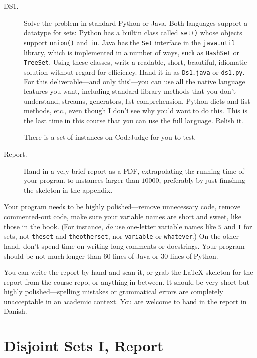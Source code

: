 \documentclass{tufte-handout}
\begin{document}
\begin{description}
  \item[DS1.]
    Solve the problem in standard Python or Java.
    Both languages support a datatype for sets:
    Python has a builtin class called \texttt{set()} whose objects support \texttt{union()} and \texttt{in}.
    Java has the \texttt{Set} interface in the \texttt{java.util} library, which is implemented in a number of ways, such as \texttt{HashSet} or \texttt{TreeSet}.
    Using these classes, write a readable, short, beautiful, idiomatic solution without regard for efficiency.
    Hand it in as \texttt{Ds1.java} or \texttt{ds1.py}.
    For this deliverable---and only this!---you can use all the native language features you want, including standard library methods that you don't understand, streams, generators, list comprehension, Python dicts and list methods, etc., even though I don't see why you'd want to do this.
    This is the last time in this course that you can use the full language.
    Relish it.
    
    There is a set of instances on CodeJudge for you to test.
  \item[Report.]
    Hand in a very brief report as a PDF, extrapolating the running time of your program to instances larger than $10000$, preferably by just finishing the skeleton in the appendix. 
\end{description}

Your program needs to be highly polished---remove unnecessary code, remove commented-out code, make sure your variable names are short and sweet, like those in the book.
(For instance, \emph{do} use one-letter variable names like \texttt{S} and \texttt{T} for sets, not \texttt{theset} and \texttt{theotherset}, nor \texttt{variable} or \texttt{whatever}.)
On the other hand, don't spend time on writing long comments or docstrings.
Your program should be not much longer than 60 lines of Java or 30 lines of Python.


You can write the report by hand and scan it, or grab the LaTeX skeleton for the report from the course repo, or anything in between.
It should be very short but highly polished---spelling mistakes or grammatical errors are completely unacceptable in an academic context.
You are welcome to hand in the report in Danish.

\newpage
\section{Disjoint Sets I, Report}
\end{document}
